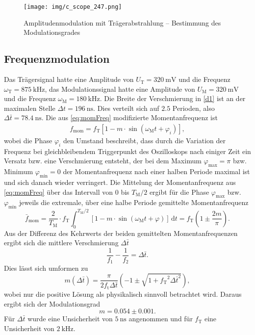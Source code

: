 \begin{figure}
	\centering
	\texttt{[image: img/c\_scope\_247.png]}
	\caption{Amplitudenmodulation mit Trägerabstrahlung -- Bestimmung des Modulationsgrades}
	\label{c2}
\end{figure}

\FloatBarrier

\subsection{Frequenzmodulation}

Das Trägersignal hatte eine Amplitude von $U_\text{T}=\SI{320}{\milli\volt}$ und die Frequenz $\omega_\text{T}=\SI{875}{\kilo\hertz}$, das Modulationssignal hatte eine Amplitude von $U_\text{M}=\SI{320}{\milli\volt}$ und die Frequenz $\omega_\text{M}=\SI{180}{\kilo\hertz}$. Die Breite der Verschmierung in \autoref{d1} ist an der maximalen Stelle $\Delta t = \SI{196}{\nano\second}$. Dies verteilt sich auf $\num{2.5}$ Perioden, also $\Delta \bar{t} = \SI{78.4}{\nano\second}$.
Die aus \autoref{eq:momFreq} modifizierte Momentanfrequenz ist
\begin{align}
	f_\text{mom} = f_\text{T} \left[ 1 - m \cdot \sin ( \omega_\text{M} t + \varphi_i ) \right],
\end{align}
wobei die Phase $\varphi_i$ den Umstand beschreibt, dass durch die Variation der Frequenz bei gleichbleibendem Triggerpunkt des Oszilloskops nach einiger Zeit ein Versatz bzw. eine Verschmierung entsteht, der bei dem Maximum $\varphi_\text{max} = \pi$ bzw. Minimum $\varphi_\text{min} = 0$ der Momentanfrequenz nach einer halben Periode maximal ist und sich danach wieder verringert.
Die Mittelung der Momentanfrequenz aus \autoref{eq:momFreq} über das Intervall von $0$ bis $T_\text{M}/2$ ergibt für die Phase $\varphi_\text{max}$ bzw. $\varphi_\text{min}$ jeweils die extremale, über eine halbe Periode gemittelte Momentanfrequenz
\[
	\bar{f}_\text{mom} = \frac{2}{T_\text{M}} \cdot f_\text{T}\int_0^{T_\text{M}/2} \left[1 - m \cdot \sin (\omega_\text{M} t + \varphi)\right] \,\text{d}t = f_\text{T}\left( 1 \pm \frac{2m}{\pi} \right).
\]
Aus der Differenz des Kehrwerts der beiden gemittelten Momentanfrequenzen ergibt sich die mittlere Verschmierung $\Delta \bar{t}$
\[
	\frac{1}{f_1} - \frac{1}{f_2} = \Delta \bar{t}.
\]
Dies lässt sich umformen zu
\[
	m(\Delta \bar{t}) = \frac{\pi}{2f_\text{t}\Delta \bar{t}} \left( -1 \pm \sqrt{ 1 + {f_\text{T}}^2 \Delta \bar{t}^2} \right),
\]
wobei nur die positive Lösung als physikalisch sinnvoll betrachtet wird. Daraus ergibt sich der Modulationsgrad
\[
m = 0.054 \pm 0.001.
\]
Für $\Delta \bar{t}$ wurde eine Unsicherheit von $\SI{5}{\nano\second}$ angenommen und für $f_\text{T}$ eine Unsicherheit von $\SI{2}{\kilo\hertz}$.\par

